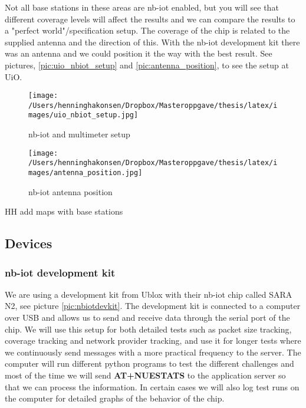 \documentclass[USenglish]{ifimaster}  %
\begin{document}
Not all base stations in these areas are \acrshort{nb-iot} enabled, but you will see that different coverage levels will affect the results and we can compare the results to a "perfect world"/specification setup. The coverage of the chip is related to the supplied antenna and the direction of this. With the \acrshort{nb-iot} development kit there was an antenna and we could position it the way with the best result. See pictures, \vref{pic:uio_nbiot_setup} and \vref{pic:antenna_position}, to see the setup at UiO.

\begin{figure}[ht]
  \centering\texttt{[image: /Users/henninghakonsen/Dropbox/Masteroppgave/thesis/latex/images/uio\_nbiot\_setup.jpg]}
  \caption{\acrshort{nb-iot} and multimeter setup}
  \label{pic:uio_nbiot_setup}
\end{figure}

\begin{figure}[ht]
  \centering\texttt{[image: /Users/henninghakonsen/Dropbox/Masteroppgave/thesis/latex/images/antenna\_position.jpg]}
  \caption{\acrshort{nb-iot} antenna position}
  \label{pic:antenna_position}
\end{figure}

HH add maps with base stations

\subsection{Devices} \label{ssection:devices}
\subsubsection{\acrshort{nb-iot} development kit}
We are using a development kit from Ublox with their \acrshort{nb-iot} chip called SARA N2, see picture \vref{pic:nbiotdevkit}. The development kit is connected to a computer over USB and allows us to send and receive data through the serial port of the chip. We will use this setup for both detailed tests such as packet size tracking, coverage tracking and network provider tracking, and use it for longer tests where we continuously send messages with a more practical frequency to the server. The computer will run different python programs to test the different challenges and most of the time we will send \textbf{AT+NUESTATS} to the application server so that we can process the information. In certain cases we will also log test runs on the computer for detailed graphs of the behavior of the chip.
\end{document}
